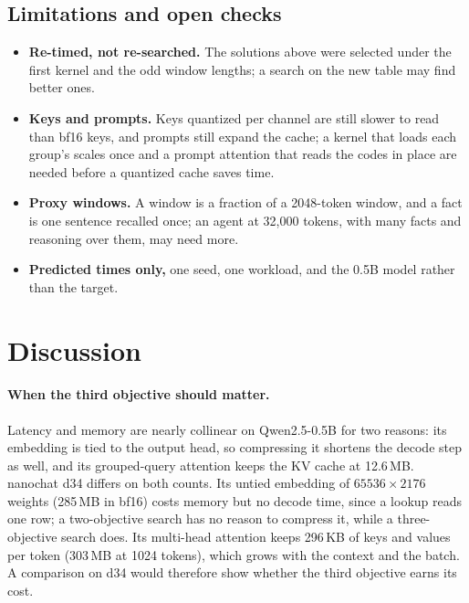 \documentclass[11pt]{article}
\begin{document}
\subsection{Limitations and open checks}
\label{sec:kv-limits}
\begin{itemize}
  \item \textbf{Re-timed, not re-searched.} The solutions above were selected under the first kernel and the
        odd window lengths; a search on the new table may find better ones.
  \item \textbf{Keys and prompts.} Keys quantized per channel are still slower to read than bf16 keys, and
        prompts still expand the cache; a kernel that loads each group's scales once and a prompt
        attention that reads the codes in place are needed before a quantized cache saves time.
  \item \textbf{Proxy windows.} A window is a fraction of a 2048-token window, and a fact is one sentence
        recalled once; an agent at 32{,}000 tokens, with many facts and reasoning over them, may need more.
  \item \textbf{Predicted times only,} one seed, one workload, and the 0.5B model rather than the target.
\end{itemize}

\section{Discussion}
\label{sec:discussion}

\paragraph{When the third objective should matter.}
Latency and memory are nearly collinear on Qwen2.5-0.5B for two reasons: its embedding is tied to the
output head, so compressing it shortens the decode step as well, and its grouped-query attention keeps
the KV cache at 12.6\,MB. nanochat d34 differs on both counts. Its untied embedding of
$65536\times2176$ weights (285\,MB in bf16) costs memory but no decode time, since a lookup reads one
row; a two-objective search has no reason to compress it, while a three-objective search does. Its
multi-head attention keeps 296\,KB of keys and values per token (303\,MB at 1024 tokens), which grows
with the context and the batch. A comparison on d34 would therefore show whether the third objective
earns its cost.
\end{document}
